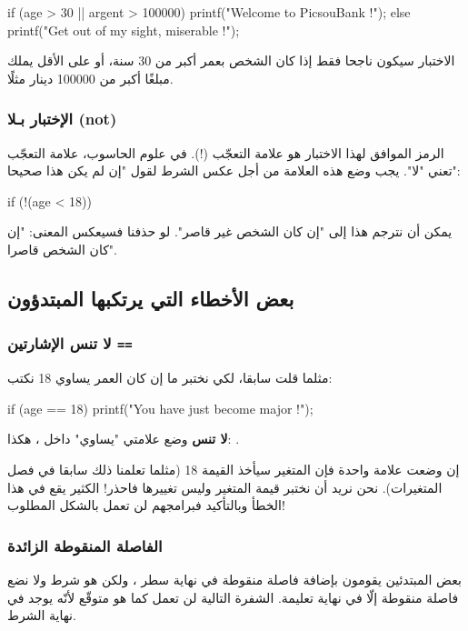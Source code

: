 \begin{Csource}
if (age > 30 || argent > 100000)
{
	printf("Welcome to PicsouBank !");
}
else
{
	printf("Get out of my sight, miserable !");
}
\end{Csource}

الاختبار سيكون ناجحا فقط إذا كان الشخص بعمر أكبر من 30 سنة، أو على الأقل يملك مبلغًا أكبر من 100000 دينار مثلًا.

\subsubsection{الإختبار بـلا (\textenglish{not})}

الرمز الموافق لهذا الاختبار هو علامة التعجّب (!). في علوم الحاسوب، علامة التعجّب تعني "لا". يجب  وضع هذه العلامة من أجل عكس الشرط لقول  "إن لم يكن هذا صحيحا":
\begin{Csource}
if (!(age < 18))
\end{Csource}

يمكن أن نترجم هذا إلى "إن كان الشخص غير قاصر". لو حذفنا
\InlineCode{!}
فسيعكس المعنى: "إن كان الشخص قاصرا".
\subsection{بعض الأخطاء التي يرتكبها المبتدؤون}

\subsubsection{لا تنس الإشارتين \texttt{==}}

مثلما قلت سابقا، لكي نختبر ما إن كان العمر يساوي 18 نكتب:

\begin{Csource}
if (age == 18)
{
	printf("You have just become major !");
}
\end{Csource}

\textbf{لا تنس}
وضع علامتي "يساوي" داخل
،
هكذا:
\InlineCode{==}.

إن وضعت علامة
\InlineCode{=}
واحدة فإن المتغير
سيأخذ القيمة 18 (مثلما تعلمنا ذلك سابقا في فصل المتغيرات). نحن نريد أن نختبر قيمة المتغير وليس تغييرها فاحذر! الكثير يقع في هذا الخطأ وبالتأكيد فبرامجهم لن تعمل بالشكل المطلوب!

\subsubsection{الفاصلة المنقوطة الزائدة}

بعض المبتدئين يقومون بإضافة فاصلة منقوطة في نهاية سطر ، ولكن  هو شرط ولا نضع فاصلة منقوطة إلّا في نهاية تعليمة. الشفرة التالية لن تعمل كما هو متوقّع لأنّه يوجد
\InlineCode{;}
في نهاية الشرط.

